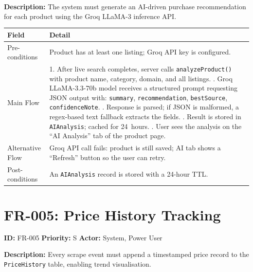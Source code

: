 \documentclass[12pt,a4paper]{report}
\begin{document}
\textbf{Description:} The system must generate an AI-driven purchase
recommendation for each product using the Groq LLaMA-3 inference API.

\begin{longtable}{L{3cm} L{10cm}}
  \toprule
  \textbf{Field} & \textbf{Detail} \\
  \midrule
  \endhead
  Pre-conditions & Product has at least one listing; Groq API key is configured. \\[3pt]
  Main Flow &
    1. After live search completes, server calls \texttt{analyzeProduct()} with
       product name, category, domain, and all listings. . Groq LLaMA-3.3-70b model receives a structured prompt requesting JSON
       output with: \texttt{summary}, \texttt{recommendation},
       \texttt{bestSource}, \texttt{confidenceNote}. . Response is parsed; if JSON is malformed, a regex-based text fallback
       extracts the fields. . Result is stored in \texttt{AIAnalysis}; cached for 24~hours. . User sees the analysis on the ``AI Analysis'' tab of the product page. \\[3pt]
  Alternative Flow &
    Groq API call fails: product is still saved; AI tab shows a ``Refresh''
    button so the user can retry. \\[3pt]
  Post-conditions & An \texttt{AIAnalysis} record is stored with a 24-hour TTL. \\
  \bottomrule
\end{longtable}

\section{FR-005: Price History Tracking}

\begin{reqbox}
\textbf{ID:} FR-005 \quad \textbf{Priority:} S \quad \textbf{Actor:} System, Power User
\end{reqbox}

\textbf{Description:} Every scrape event must append a timestamped price record
to the \texttt{PriceHistory} table, enabling trend visualisation.
\end{document}
